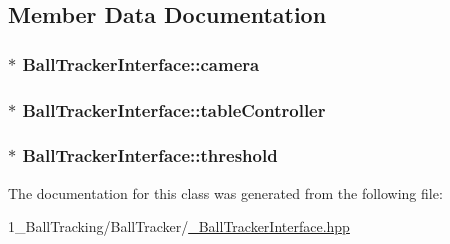 \subsection{Member Data Documentation}
\subsubsection[{\texorpdfstring{camera}{camera}}]{$\ast$ Ball\+Tracker\+Interface\+::camera\hspace{0.3cm}{\ttfamily [protected]}}\hypertarget{class_ball_tracker_interface_a48d727df5926f57a6cd5c2b75d039604}{}\label{class_ball_tracker_interface_a48d727df5926f57a6cd5c2b75d039604}
\subsubsection[{\texorpdfstring{table\+Controller}{tableController}}]{$\ast$ Ball\+Tracker\+Interface\+::table\+Controller\hspace{0.3cm}{\ttfamily [protected]}}\hypertarget{class_ball_tracker_interface_a1716b6f0ad84d9d68da4dec0955450bf}{}\label{class_ball_tracker_interface_a1716b6f0ad84d9d68da4dec0955450bf}
\subsubsection[{\texorpdfstring{threshold}{threshold}}]{$\ast$ Ball\+Tracker\+Interface\+::threshold\hspace{0.3cm}{\ttfamily [protected]}}\hypertarget{class_ball_tracker_interface_ae6c6c4c3d89a8cc65bceec6c56af3b62}{}\label{class_ball_tracker_interface_ae6c6c4c3d89a8cc65bceec6c56af3b62}


The documentation for this class was generated from the following file\+:\begin{DoxyCompactItemize}
\item 
1\+\_\+\+Ball\+Tracking/\+Ball\+Tracker/\hyperlink{___ball_tracker_interface_8hpp}{\+\_\+\+Ball\+Tracker\+Interface.\+hpp}\end{DoxyCompactItemize}
